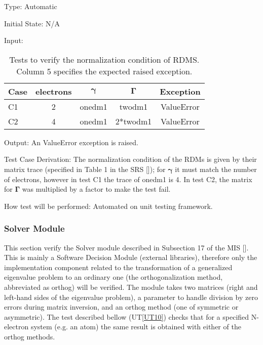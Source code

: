 \documentclass[12pt, titlepage]{article}
\newcommand{\uref}[1]{UT\ref{#1}}
\begin{document}
\begin{enumerate}
	Type: Automatic
	
	Initial State: N/A
	
	Input: 
	
	\begin{table}[h!]
		\centering
		\begin{tabular}{lcccc}
			Case & electrons & $\boldsymbol{\gamma}$ & $\boldsymbol{\Gamma}$ & 
			Exception  \\ 
			\toprule
			C1   &     2     &    onedm1    &    twodm1    & ValueError \\
			C2   &     4     &    onedm1    &    2*twodm1    & ValueError \\ 
			\bottomrule
		\end{tabular}
		\caption{Tests to verify the normalization condition of RDMS. Column 5 
			specifies the expected raised exception.}
		\label{table:normdms}
	\end{table}
	
	Output: An ValueError exception is raised.
	
	Test Case Derivation: The normalization condition of the RDMs is given by 
	their matrix trace (specified in Table 1 in the SRS [\cite{SRS2020}]); for 
	$\boldsymbol{\gamma}$ it must match the number of electrons, however in 
	test C1 the trace of onedm1 is 4. In test C2, the matrix for 
	$\boldsymbol{\Gamma}$ was multiplied by a factor to make the test fail.
	
	How test will be performed: Automated on unit testing framework.
	
\end{enumerate}


\subsubsection{Solver Module}
\label{sec:M12}

This section verify the Solver module described in 
Subsection 17 of the MIS [\cite{MIS2020}]. This is mainly a Software Decision 
Module (external libraries), therefore only the implementation component 
related to the transformation of a generalized eigenvalue problem to an 
ordinary one (the orthogonalization method, abbreviated as orthog) will be 
verified. The module takes two matrices (right and left-hand sides of the 
eigenvalue problem), a parameter to handle division by zero errors during 
matrix inversion, and an orthog method (one of symmetric or asymmetric). The 
test described bellow (\uref{UT10}) checks that for a specified N-electron 
system 
(e.g. an atom) the same result is obtained with either of the orthog methods.
\end{document}
